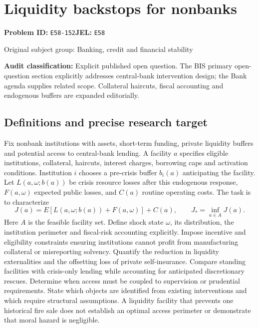 \documentclass[11pt,a4paper]{article}
\begin{document}
\section*{Liquidity backstops for nonbanks}
\textbf{Problem ID:} \texttt{E58-152}\quad \textbf{JEL:} \texttt{E58}\par
\label{problem:OP-0326}
{\sffamily\small\color{muted}Original subject group: Banking, credit and financial stability\par}
\label{definitions:problem:30007608}
\textbf{Audit classification:} Explicit published open question. The BIS primary open-question section explicitly addresses central-bank intervention design; the Bank agenda supplies related scope. Collateral haircuts, fiscal accounting and endogenous buffers are expanded editorially.
\subsection*{Definitions and precise research target}
Fix nonbank institutions with assets, short-term funding, private liquidity buffers and potential access to central-bank lending. A facility \(a\) specifies eligible institutions, collateral, haircuts, interest charges, borrowing caps and activation conditions. Institution \(i\) chooses a pre-crisis buffer \(b_i(a)\) anticipating the facility. Let \(L(a,\omega;b(a))\) be crisis resource losses after this endogenous response, \(F(a,\omega)\) expected public losses, and \(C(a)\) routine operating costs. The task is to characterize
\[J(a)=E[L(a,\omega;b(a))+F(a,\omega)]+C(a),\qquad J_*=\inf_{a\in A}J(a).\]
Here \(A\) is the feasible facility set. Define shock state \(\omega\), its distribution, the institution perimeter and fiscal-risk accounting explicitly. Impose incentive and eligibility constraints ensuring institutions cannot profit from manufacturing collateral or misreporting solvency. Quantify the reduction in liquidity externalities and the offsetting loss of private self-insurance. Compare standing facilities with crisis-only lending while accounting for anticipated discretionary rescues. Determine when access must be coupled to supervision or prudential requirements. State which objects are identified from existing interventions and which require structural assumptions. A liquidity facility that prevents one historical fire sale does not establish an optimal access perimeter or demonstrate that moral hazard is negligible.
\end{document}

